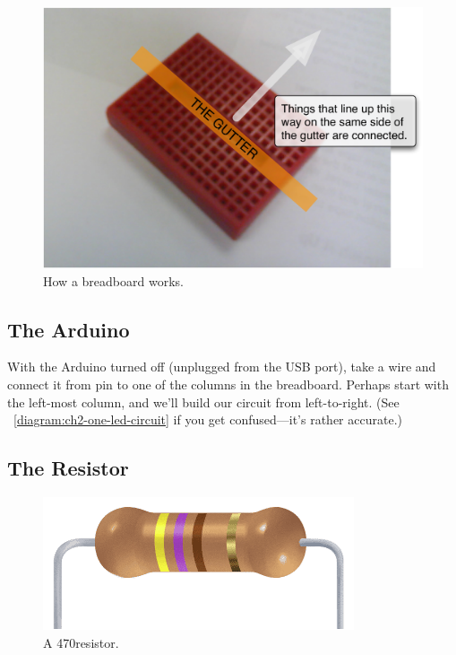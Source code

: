 \begin{figure}[ht]
  \begin{center}
    \includegraphics[width=0.8\linewidth]{images/ch2-little-red-breadboard-connections}
    \caption{How a breadboard works.}
    \label{diagram:ch2-little-red-breadboard-connections}
  \end{center}
\end{figure}

\subsection{The Arduino}
With the Arduino turned off (unplugged from the USB port), take a wire and connect it from pin \chtwopin to one of the columns in the breadboard. Perhaps start with the left-most column, and we'll build our circuit from left-to-right. (See ~\vref{diagram:ch2-one-led-circuit} if you get confused---it's rather accurate.) 

\subsection{The Resistor}
\begin{figure}
	  \begin{center}
    	\includegraphics[width=0.9\linewidth]{images/20100109-470-ohm-resistor}
			\captionsetup{labelformat=empty,justification=centering}%
   		\caption{A 470\ohm resistor.}
  \end{center}
\end{figure}

